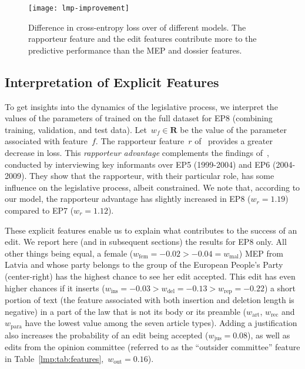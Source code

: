 \begin{figure}
	\centering
	\texttt{[image: lmp-improvement]}
	\caption{%
		Difference in cross-entropy loss over \wow{} of different models.
		The rapporteur feature and the edit features contribute more to the predictive performance than the MEP and dossier features.
	}
	\label{lmp:fig:improvement}
\end{figure}

\subsection{Interpretation of Explicit Features}

To get insights into the dynamics of the legislative process, we interpret the values of the parameters of  trained on the full dataset for EP8 (combining training, validation, and test data).
Let~$w_f \in \mathbf{R}$ be the value of the parameter associated with feature~$f$.
The rapporteur feature~$r$ of \ provides a greater decrease in loss.
This \textit{rapporteur advantage} complements the findings of~\citet{costello2010policy}, conducted by interviewing key informants over EP5 (1999-2004) and EP6 (2004-2009).
They show that the rapporteur, with their particular role, has some influence on the legislative process, albeit constrained.
We note that, according to our model, the rapporteur advantage has slightly increased in EP8 ($w_r=1.19$) compared to EP7 ($w_r=1.12$).

These explicit features enable us to explain what contributes to the success of an edit.
We report here (and in subsequent sections) the results for EP8 only.
All other things being equal, a female ($w_{\text{fem}}=-0.02 > -0.04 = w_{\text{mal}}$) MEP from Latvia and whose party belongs to the group of the European People's Party (center-right) has the highest chance to see her edit accepted.
This edit has even higher chances if it inserts ($w_{\text{ins}}=-0.03 > w_{\text{del}}=-0.13 > w_{\text{rep}}=-0.22$) a short portion of text (the feature associated with both insertion and deletion length is negative) in a part of the law that is not its body or its preamble ($w_{\text{art}}$, $w_{\text{rec}}$  and~$w_{\text{para}}$ have the lowest value among the seven article types).
Adding a justification also increases the probability of an edit being accepted ($w_{\text{jus}}=0.08$), as well as edits from the opinion committee (referred to as the ``outsider committee'' feature in Table~\ref{lmp:tab:features},~$w_{\text{out}} =  0.16$).

